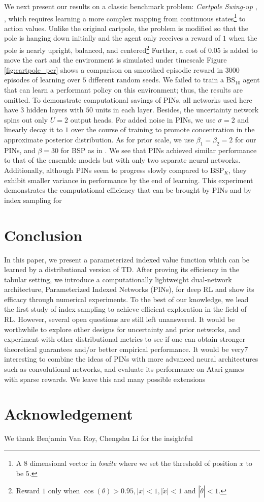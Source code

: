 \documentclass[letterpaper]{article} %
\newcommand{\abs}[1]{\left|#1\right|}
\theoremstyle{definition}
\begin{document}
We next present our results on a classic benchmark problem: \textit{Cartpole Swing-up} \cite{sutton2018reinforcement}, \cite{osband2019bsuite}, which requires learning a more complex mapping from continuous states\footnote{A $8$ dimensional vector in \textit{bsuite} where we set the threshold of position $x$ to be $5$.} to action values. Unlike the original cartpole, the problem is modified so that the pole is hanging down initially and the agent only receives a reward of $1$ when the pole is nearly upright, balanced, and centered\footnote{Reward $1$ only when $\cos(\theta) > 0.95, \abs{x} < 1, \abs{\Dot{x}} < 1$ and $|\Dot{\theta}| < 1$.} Further, a cost of $0.05$ is added to move the cart and the environment is simulated under timescale  Figure \ref{fig:cartpole_per} shows a comparison on smoothed episodic reward in $3000$ episodes of learning over $5$ different random seeds. We failed to train a $\mathrm{BS}_{10}$ agent that can learn a performant policy on this environment; thus, the results are omitted. To demonstrate computational savings of PINs, all networks used here have $3$ hidden layers with $50$ units in each layer. Besides, the uncertainty network spins out only $U=2$ output heads. For added noise in PINs, we use $\sigma=2$ and linearly decay it to $1$ over the course of training to promote concentration in the approximate posterior distribution. As for prior scale, we use $\beta_1=\beta_2=2$ for our PINs, and $\beta=30$ for BSP as in \cite{osband2018randomized}. We see that PINs achieved similar performance to that of the ensemble models but with only two separate neural networks. Additionally, although PINs seem to progress slowly compared to $\mathrm{BSP}_K$, they exhibit smaller variance in performance by the end of learning. This experiment demonstrates the computational efficiency that can be brought by PINs and by index sampling for

\vspace{-3.59mm}
\section{Conclusion}

\vspace{-3.57mm}
In this paper, we present a parameterized indexed value function which can be learned by a distributional version of TD. After proving its efficiency in the tabular setting, we introduce a computationally lightweight dual-network architecture, Parameterized Indexed Networks (PINs), for deep RL and show its efficacy through numerical experiments. To the best of our knowledge, we lead the first study of index sampling to achieve efficient exploration in the field of RL.  However, several open questions are still left unanswered. It would be worthwhile to explore other designs for uncertainty and prior networks, and experiment with other distributional metrics to see if one can obtain stronger theoretical guarantees and/or better empirical performance. It would be very7 interesting to combine the ideas of PINs with more advanced neural architectures such as convolutional networks, and evaluate its performance on Atari games with sparse rewards. We leave this and many possible extensions

\section{Acknowledgement}
We thank Benjamin Van Roy, Chengshu Li for the insightful

\medskip

\clearpage


\end{document}
